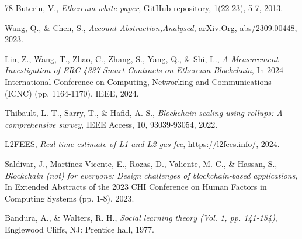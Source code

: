 \documentclass[preprint,12pt]{elsarticle}
\begin{document}
\begin{thebibliography}{78}
Buterin, V.,
\textit{Ethereum white paper},
GitHub repository, 1(22-23), 5-7,
2013.

Wang, Q., \& Chen, S.,
\textit{Account Abstraction,Analysed},
arXiv.Org, abs/2309.00448,
2023.

Lin, Z., Wang, T., Zhao, C., Zhang, S., Yang, Q., \& Shi, L.,
\textit{A Measurement Investigation of ERC-4337 Smart Contracts on Ethereum Blockchain},
In 2024 International Conference on Computing, Networking and Communications (ICNC) (pp. 1164-1170). IEEE,
2024.

Thibault, L. T., Sarry, T., \& Hafid, A. S.,
\textit{Blockchain scaling using rollups: A comprehensive survey},
IEEE Access, 10, 93039-93054,
2022.

L2FEES,
\textit{Real time estimate of L1 and L2 gas fee},
\url{https://l2fees.info/},
2024.

Saldivar, J., Martínez-Vicente, E., Rozas, D., Valiente, M. C., \& Hassan, S.,
\textit{Blockchain (not) for everyone: Design challenges of blockchain-based applications},
In Extended Abstracts of the 2023 CHI Conference on Human Factors in Computing Systems (pp. 1-8),
2023.

Bandura, A., \& Walters, R. H.,
\textit{Social learning theory (Vol. 1, pp. 141-154)},
Englewood Cliffs, NJ: Prentice hall,
1977.


\end{thebibliography}
\end{document}
